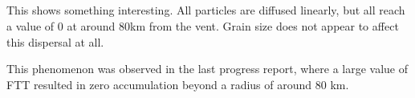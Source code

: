 \documentclass[11pt]{article}
\begin{document}
    \begin{center}
    \end{center}
    { \hspace*{\fill} \\}
    
    \begin{center}
    \end{center}
    { \hspace*{\fill} \\}
    
    \begin{center}
    \end{center}
    { \hspace*{\fill} \\}
    
    \begin{center}
    \end{center}
    { \hspace*{\fill} \\}
    
    This shows something interesting. All particles are diffused linearly,
but all reach a value of 0 at around 80km from the vent. Grain size does
not appear to affect this dispersal at all.

This phenomenon was observed in the last progress report, where a large
value of FTT resulted in zero accumulation beyond a radius of around 80
km.


    
    
    
    
\end{document}

